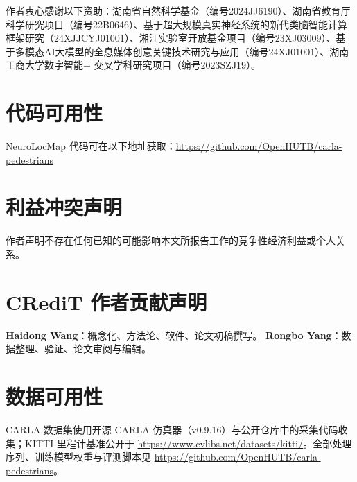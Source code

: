 \documentclass[review,12pt]{elsarticle}
\begin{document}
作者衷心感谢以下资助：湖南省自然科学基金（编号2024JJ6190）、湖南省教育厅科学研究项目（编号22B0646）、基于超大规模真实神经系统的新代类脑智能计算框架研究（24XJJCYJ01001）、湘江实验室开放基金项目（编号23XJ03009）、基于多模态AI大模型的全息媒体创意关键技术研究与应用（编号24XJ01001）、湖南工商大学数字智能+ 交叉学科研究项目（编号2023SZJ19）。

\section*{代码可用性}

NeuroLocMap 代码可在以下地址获取：\url{https://github.com/OpenHUTB/carla-pedestrians}

\section*{利益冲突声明}

作者声明不存在任何已知的可能影响本文所报告工作的竞争性经济利益或个人关系。

\section*{CRediT 作者贡献声明}

\textbf{Haidong Wang}：概念化、方法论、软件、论文初稿撰写。 \textbf{Rongbo Yang}：数据整理、验证、论文审阅与编辑。

\section*{数据可用性}

CARLA 数据集使用开源 CARLA 仿真器（v0.9.16）与公开仓库中的采集代码收集；KITTI 里程计基准公开于 \url{https://www.cvlibs.net/datasets/kitti/}。全部处理序列、训练模型权重与评测脚本见 \url{https://github.com/OpenHUTB/carla-pedestrians}。



\end{document}
